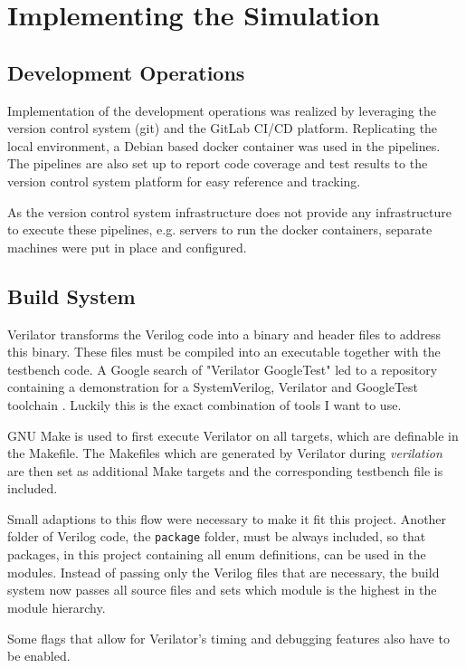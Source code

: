 \chapter{Implementing the Simulation}

\section{Development Operations}
Implementation of the development operations was realized by leveraging the version control system (git) and the GitLab CI/CD platform. Replicating the local environment, a Debian based docker container \cite{dockerVerilator} was used in the pipelines. The pipelines are also set up to report code coverage and test results to the version control system platform for easy reference and tracking.

As the version control system infrastructure does not provide any infrastructure to execute these pipelines, e.g. servers to run the docker containers, separate machines were put in place and configured.

\section{Build System}
Verilator transforms the Verilog code into a binary and header files to address this binary. These files must be compiled into an executable together with the testbench code. A Google search of "Verilator GoogleTest" led to a repository containing a demonstration for a SystemVerilog, Verilator and GoogleTest toolchain \cite{toolchain}. Luckily this is the exact combination of tools I want to use. 

GNU Make is used to first execute Verilator on all targets, which are definable in the Makefile. The Makefiles which are generated by Verilator during \textit{verilation} are then set as additional Make targets and the corresponding testbench file is included.

Small adaptions to this flow were necessary to make it fit this project. Another folder of Verilog code, the \texttt{package} folder, must be always included, so that packages, in this project containing all enum definitions, can be used in the modules. Instead of passing only the Verilog files that are necessary, the build system now passes all source files and sets which module is the highest in the module hierarchy. 

Some flags that allow for Verilator's timing and debugging features also have to be enabled.


